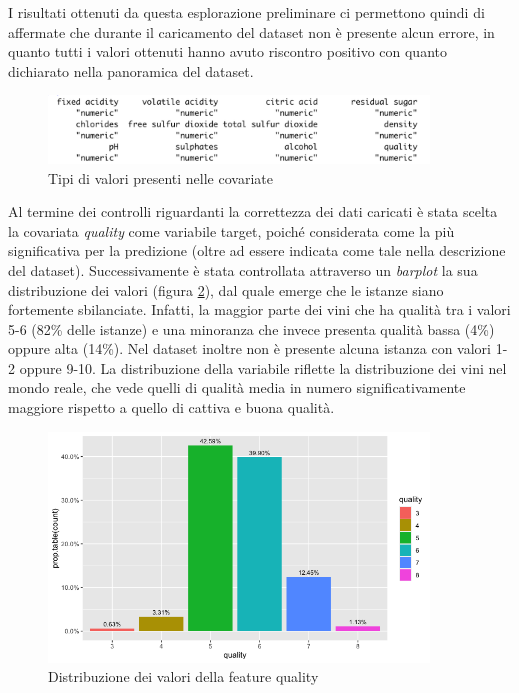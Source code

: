     I risultati ottenuti da questa esplorazione preliminare ci permettono quindi di affermate che durante il caricamento del dataset non è presente alcun errore, in quanto tutti i valori ottenuti hanno avuto riscontro positivo con quanto dichiarato nella panoramica del dataset.
    
    \begin{figure}[h]
        \includegraphics[width=0.9\textwidth]{img/Output_sapply().png}
        \centering
        \caption{Tipi di valori presenti nelle covariate}
        \label{fig:out_sapply}
    \end{figure}
    
    Al termine dei controlli riguardanti la correttezza dei dati caricati è stata scelta la covariata \textit{quality} come variabile target, poiché considerata come la più significativa per la predizione (oltre ad essere indicata come tale nella descrizione del dataset). Successivamente è stata controllata attraverso un \textit{barplot} la sua distribuzione dei valori (figura \ref{fig:out_barplot}), dal quale emerge che le istanze siano fortemente sbilanciate. Infatti, la maggior parte dei vini che ha qualità tra i valori 5-6 (82\% delle istanze) e una minoranza che invece presenta qualità bassa (4\%) oppure alta (14\%). 
    Nel dataset inoltre non è presente alcuna istanza con valori 1-2 oppure 9-10. La distribuzione della variabile riflette la distribuzione dei vini nel mondo reale, che vede quelli di qualità media in numero significativamente maggiore rispetto a quello di cattiva e buona qualità. 
    
    \imagespace
    \begin{figure}[!h]
        \includegraphics[width=0.9\textwidth]{img/Barplot_quality.png}
        \centering
        \caption{Distribuzione dei valori della feature quality}
        \label{fig:out_barplot}
    \end{figure}

